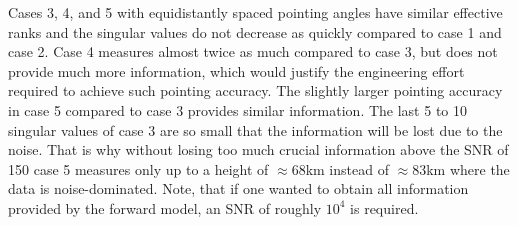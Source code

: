 Cases 3, 4, and 5 with equidistantly spaced pointing angles have similar effective ranks and the singular values do not decrease as quickly compared to case 1 and case 2.
Case 4 measures almost twice as much compared to case 3, but does not provide much more information, which would justify the engineering effort required to achieve such pointing accuracy.
The slightly larger pointing accuracy in case 5 compared to case 3 provides similar information.
The last 5 to 10 singular values of case 3 are so small that the information will be lost due to the noise.
That is why without losing too much crucial information above the SNR of 150 case 5 measures only up to a height of $\approx 68$km instead of $\approx83$km where the data is noise-dominated.
Note, that if one wanted to obtain all information provided by the forward model, an SNR of roughly $10^4$ is required.
% 
